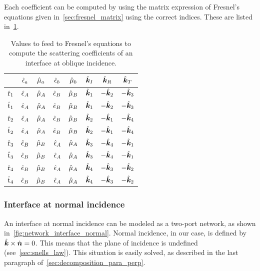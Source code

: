 Each coefficient can be computed by using the matrix expression of Fresnel's equations given in~\cref{sec:fresnel_matrix} using the correct indices.
These are listed in~\cref{tab:fresnel_implementation_indices}.
\begin{table}
    \centering
    \begin{tabular}{cccccccc}
        \toprule
                       & $\hat{\epsilon}_a$ & $\hat{\mu}_a$ & $\hat{\epsilon}_b$ & $\hat{\mu}_b$ & $\hat{\bm{k}}_I$ & $\hat{\bm{k}}_R$ & $\hat{\bm{k}}_T$ \\
        \midrule
        $\hat{\mathrm{r}}_1$ & $\hat{\epsilon}_A$ & $\hat{\mu}_A$ & $\hat{\epsilon}_B$ & $\hat{\mu}_B$ & $\hat{\bm{k}}_1$  & $-\hat{\bm{k}}_2$ & $-\hat{\bm{k}}_3$ \\
        $\hat{\mathrm{t}}_1$ & $\hat{\epsilon}_A$ & $\hat{\mu}_A$ & $\hat{\epsilon}_B$ & $\hat{\mu}_B$ & $\hat{\bm{k}}_1$  & $-\hat{\bm{k}}_2$ & $-\hat{\bm{k}}_3$ \\
        $\hat{\mathrm{r}}_2$ & $\hat{\epsilon}_A$ & $\hat{\mu}_A$ & $\hat{\epsilon}_B$ & $\hat{\mu}_B$ & $\hat{\bm{k}}_2$  & $-\hat{\bm{k}}_1$ & $-\hat{\bm{k}}_4$ \\
        $\hat{\mathrm{t}}_2$ & $\hat{\epsilon}_A$ & $\hat{\mu}_A$ & $\hat{\epsilon}_B$ & $\hat{\mu}_B$ & $\hat{\bm{k}}_2$  & $-\hat{\bm{k}}_1$ & $-\hat{\bm{k}}_4$ \\
        $\hat{\mathrm{r}}_3$ & $\hat{\epsilon}_B$ & $\hat{\mu}_B$ & $\hat{\epsilon}_A$ & $\hat{\mu}_A$ & $\hat{\bm{k}}_3$  & $-\hat{\bm{k}}_4$ & $-\hat{\bm{k}}_1$ \\
        $\hat{\mathrm{t}}_3$ & $\hat{\epsilon}_B$ & $\hat{\mu}_B$ & $\hat{\epsilon}_A$ & $\hat{\mu}_A$ & $\hat{\bm{k}}_3$  & $-\hat{\bm{k}}_4$ & $-\hat{\bm{k}}_1$ \\
        $\hat{\mathrm{r}}_4$ & $\hat{\epsilon}_B$ & $\hat{\mu}_B$ & $\hat{\epsilon}_A$ & $\hat{\mu}_A$ & $\hat{\bm{k}}_4$  & $-\hat{\bm{k}}_3$ & $-\hat{\bm{k}}_2$ \\
        $\hat{\mathrm{t}}_4$ & $\hat{\epsilon}_B$ & $\hat{\mu}_B$ & $\hat{\epsilon}_A$ & $\hat{\mu}_A$ & $\hat{\bm{k}}_4$  & $-\hat{\bm{k}}_3$ & $-\hat{\bm{k}}_2$ \\
        \bottomrule
    \end{tabular}
    \caption{
        Values to feed to Fresnel's equations to compute the scattering coefficients
        of an interface at oblique incidence.
    }
    \label{tab:fresnel_implementation_indices}
\end{table}


\subsubsection{Interface at normal incidence}
\label{sec:interface_normal_incidence}
An interface at normal incidence can be modeled as a two-port network,
as shown in~\cref{fig:network_interface_normal}.
Normal incidence, in our case, is defined by~$\hat{\bm{k}} \times \dot{\bm{n}} = 0$.
This means that the plane of incidence is undefined (see~\cref{sec:snells_law}).
This situation is easily solved, as described in the last paragraph of~\cref{sec:decomposition_para_perp}.

